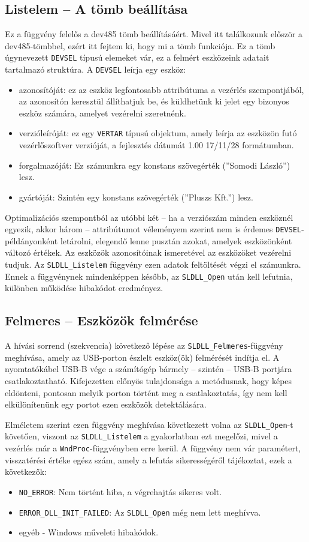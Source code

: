 \documentclass[tocnopagenum]{thesis-ekf}
\theoremstyle{definition}
\theoremstyle{remark}
\begin{document}
	\subsection{Listelem -- A tömb beállítása}
	Ez a függvény felelős a dev485 tömb beállításáért. Mivel itt találkozunk először a dev485-tömbbel, ezért itt fejtem ki, hogy mi a tömb funkciója. Ez a tömb úgynevezett \verb*|DEVSEL| típusú elemeket vár, ez a felmért eszközeink adatait tartalmazó struktúra. A \verb*|DEVSEL| leírja egy eszköz: \begin{itemize}
		\item azonosítóját: ez az eszköz legfontosabb attribútuma a vezérlés szempontjából, az azonosítón keresztül állíthatjuk be, és küldhetünk ki jelet egy bizonyos eszköz számára, amelyet vezérelni szeretnénk.
		\item verzióleíróját: ez egy \verb*|VERTAR| típusú objektum, amely leírja az eszközön futó vezérlőszoftver verzióját, a fejlesztés dátumát 1.00 17/11/28 formátumban.
		\item forgalmazóját: Ez számunkra egy konstans szövegérték (''Somodi László'') lesz.
		\item gyártóját: Szintén egy konstans szövegérték (''Pluszs Kft.'') lesz.
	\end{itemize}
	Optimalizációs szempontból az utóbbi két  -- ha a verziószám minden eszköznél egyezik, akkor három -- attribútumot véleményem szerint nem is érdemes \verb*|DEVSEL|-példányonként letárolni, elegendő lenne pusztán azokat, amelyek eszközönként változó értékek. Az eszközök azonosítóinak ismeretével az eszközöket vezérelni tudjuk. Az \verb*|SLDLL_Listelem| függvény ezen adatok feltöltését végzi el számunkra.	Ennek a függvénynek mindenképpen később, az \verb*|SLDLL_Open| után kell lefutnia, különben működése hibakódot eredményez.
	\subsection{Felmeres -- Eszközök felmérése}
	A hívási sorrend (szekvencia) következő lépése az \verb*|SLDLL_Felmeres|-függvény meghívása, amely az USB-porton észlelt eszköz(ök) felmérését indítja el. A nyomtatókábel USB-B vége a számítógép bármely -- szintén -- USB-B portjára csatlakoztatható. Kifejezetten előnyös tulajdonsága a metódusnak, hogy képes eldönteni, pontosan melyik porton történt meg a csatlakoztatás, így nem kell elkülönítenünk egy portot ezen eszközök detektálására.
	
	Elméletem szerint ezen függvény meghívása következett volna az \verb*|SLDLL_Open|-t követően, viszont az \verb*|SLDLL_Listelem| a gyakorlatban ezt megelőzi, mivel a vezérlés már a \verb*|WndProc|-függvényben erre kerül.  A függvény nem vár paramétert, visszatérési értéke egész szám, amely a lefutás sikerességéről tájékoztat, ezek a következők:
	\begin{itemize}
		\item \verb*|NO_ERROR|: Nem történt hiba, a végrehajtás sikeres volt.
		\item \verb*|ERROR_DLL_INIT_FAILED|: Az \verb*|SLDLL_Open| még nem lett meghívva.
		\item egyéb - Windows műveleti hibakódok.
	\end{itemize}
\end{document}
